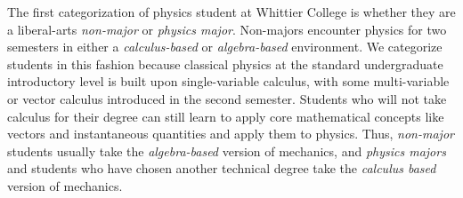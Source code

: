 \documentclass[../../main.tex]{subfiles}
\begin{document}
\label{sec:teaching_phil1}

The first categorization of physics student at Whittier College is whether they are a liberal-arts \textit{non-major} or \textit{physics major}.  Non-majors encounter physics for two semesters in either a \textit{calculus-based} or \textit{algebra-based} environment.  We categorize students in this fashion because classical physics at the standard undergraduate introductory level is built upon single-variable calculus, with some multi-variable or vector calculus introduced in the second semester.  Students who will not take calculus for their degree can still learn to apply core mathematical concepts like vectors and instantaneous quantities and apply them to physics.  Thus, \textit{non-major} students usually take the \textit{algebra-based} version of mechanics, and \textit{physics majors} and students who have chosen another technical degree take the \textit{calculus based} version of mechanics.  \\ \hspace{0.1cm}
\end{document}
